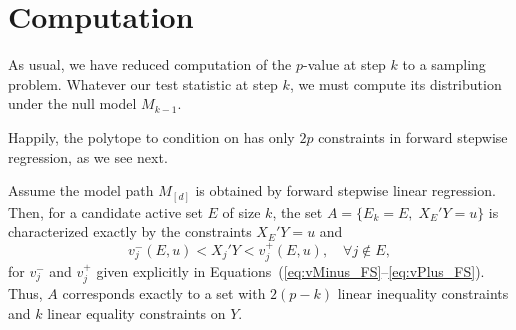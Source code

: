 \documentclass{article}
\begin{document}
\section{Computation}

As usual, we have reduced computation of the $p$-value at step $k$ to a sampling problem. Whatever our test statistic at step $k$, we must compute its distribution under the null model $M_{k-1}$.

Happily, the polytope to condition on has only $2p$ constraints in forward stepwise regression, as we see next.

\begin{theorem}
  Assume the model path $M_{[d]}$ is obtained by forward stepwise 
  linear regression. Then, for a candidate active set $E$ of size $k$, 
  the set $A = \{E_k = E, \;X_E'Y = u\}$ is characterized 
  exactly by the constraints $X_E'Y=u$ and
  \[
  v_j^-(E,u) < X_j'Y < v_j^+(E,u), \quad\forall j \notin E,
  \]
  for $v_j^-$ and $v_j^+$ given explicitly in
  Equations~(\ref{eq:vMinus_FS}--\ref{eq:vPlus_FS}).
  Thus, $A$ corresponds exactly to 
  a set with $2(p-k)$ linear inequality constraints and $k$
  linear equality constraints on $Y$.
\end{theorem}
\end{document}
